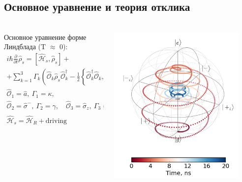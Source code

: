 \documentclass[aspectratio=169, 13pt]{beamer}
\newcommand{\sbrkt}[1]{\left[ #1 \right]}
\newcommand{\rbrkt}[1]{\left( #1 \right)}
\begin{document}
\subsection*{Основное уравнение и теория отклика}
\begin{frame}[noframenumbering, c]\frametitle{\secname}\framesubtitle{\subsecname}
\begin{columns}[c]

\begin{column}{0.5\textwidth}
Основное уравнение форме Линдблада (T $\approx$ 0):
\begin{gather*}
i\hbar \frac{\partial}{\partial t}\hat \rho_s = \sbrkt{\mathcal{\hat H}_s, \hat \rho_s} + \\
+ \sum_{k=1}^3 \Gamma_k \rbrkt{\mathcal{\hat O}_k \hat \rho_s \mathcal{\hat O}_k^\dag - \frac{1}{2} \left\{ \mathcal{\hat O}_k^\dag \mathcal{\hat O}_k, \hat \rho_s \right\} } \\
\mathcal{\hat O}_1 = \hat a,\ \Gamma_1 = \kappa,\\
\mathcal{\hat O}_2 = \hat \sigma^-,\ \Gamma_2 = \gamma, \quad 
\mathcal{\hat O}_3 = \hat \sigma_z,\ \Gamma_3 = \gamma_\phi, \\
\mathcal{\hat H}_s = \mathcal{\hat H}_R + \text{driving}
\end{gather*}
\end{column}
\begin{column}{0.5\textwidth}
\includegraphics[width=0.9\textwidth]{rabi_dynamics_bloch_rel}
\end{column}
\end{columns}
\end{frame}
\end{document}
